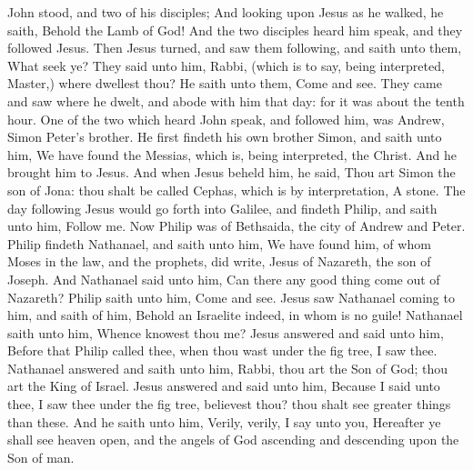 

 John stood, and two of his disciples; And looking upon Jesus as he walked, he saith, Behold the Lamb of God! And the two disciples heard him speak, and they followed Jesus. Then Jesus turned, and saw them following, and saith unto them, What seek ye? They said unto him, Rabbi, (which is to say, being interpreted, Master,) where dwellest thou? He saith unto them, Come and see. They came and saw where he dwelt, and abode with him that day: for it was about the tenth hour. One of the two which heard John speak, and followed him, was Andrew, Simon Peter's brother. He first findeth his own brother Simon, and saith unto him, We have found the Messias, which is, being interpreted, the Christ. And he brought him to Jesus. And when Jesus beheld him, he said, Thou art Simon the son of Jona: thou shalt be called Cephas, which is by interpretation, A stone. The day following Jesus would go forth into Galilee, and findeth Philip, and saith unto him, Follow me. Now Philip was of Bethsaida, the city of Andrew and Peter. Philip findeth Nathanael, and saith unto him, We have found him, of whom Moses in the law, and the prophets, did write, Jesus of Nazareth, the son of Joseph. And Nathanael said unto him, Can there any good thing come out of Nazareth? Philip saith unto him, Come and see. Jesus saw Nathanael coming to him, and saith of him, Behold an Israelite indeed, in whom is no guile! Nathanael saith unto him, Whence knowest thou me? Jesus answered and said unto him, Before that Philip called thee, when thou wast under the fig tree, I saw thee. Nathanael answered and saith unto him, Rabbi, thou art the Son of God; thou art the King of Israel. Jesus answered and said unto him, Because I said unto thee, I saw thee under the fig tree, believest thou? thou shalt see greater things than these. And he saith unto him, Verily, verily, I say unto you, Hereafter ye shall see heaven open, and the angels of God ascending and descending upon the Son of man.

